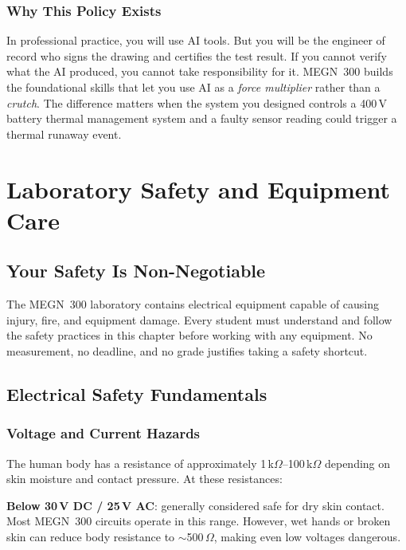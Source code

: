 \documentclass[11pt,letterpaper,twoside,openany]{book}
\begin{document}
\subsection*{Why This Policy Exists}
In professional practice, you will use AI tools. But you will be the engineer of record who signs the drawing and certifies the test result. If you cannot verify what the AI produced, you cannot take responsibility for it. MEGN~300 builds the foundational skills that let you use AI as a \emph{force multiplier} rather than a \emph{crutch}. The difference matters when the system you designed controls a 400\,V battery thermal management system and a faulty sensor reading could trigger a thermal runaway event.

\mainmatter

\chapter*{Laboratory Safety and Equipment Care}
\label{ch:safety}

\section*{Your Safety Is Non-Negotiable}
The MEGN~300 laboratory contains electrical equipment capable of causing injury, fire, and equipment damage. Every student must understand and follow the safety practices in this chapter before working with any equipment. No measurement, no deadline, and no grade justifies taking a safety shortcut.

\section*{Electrical Safety Fundamentals}
\subsection*{Voltage and Current Hazards}
The human body has a resistance of approximately 1\,k$\Omega$--100\,k$\Omega$ depending on skin moisture and contact pressure. At these resistances:

\textbf{Below 30\,V DC / 25\,V AC}: generally considered safe for dry skin contact. Most MEGN~300 circuits operate in this range. However, wet hands or broken skin can reduce body resistance to $\sim$500\,$\Omega$, making even low voltages dangerous.
\end{document}
